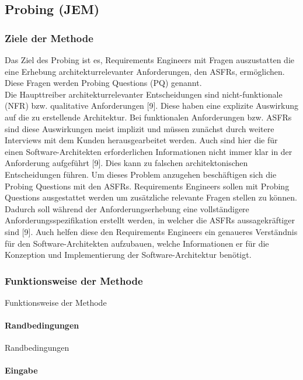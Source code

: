 \subsection{Probing (JEM)}

\subsubsection{Ziele der Methode}

Das Ziel des Probing ist es, Requirements Engineers mit Fragen auszustatten die eine Erhebung architekturrelevanter Anforderungen, den ASFRs, ermöglichen. Diese Fragen werden Probing Questions (PQ) genannt. \\

Die Haupttreiber architekturrelevanter Entscheidungen sind nicht-funktionale (NFR) bzw. qualitative Anforderungen [9]. Diese haben eine explizite Auswirkung auf die zu erstellende Architektur. Bei funktionalen Anforderungen bzw. ASFRs sind diese Auswirkungen meist implizit und müssen zunächst durch weitere Interviews mit dem Kunden herausgearbeitet werden. Auch sind hier die für einen Software-Architekten erforderlichen Informationen nicht immer klar in der Anforderung aufgeführt [9]. Dies kann zu falschen architektonischen Entscheidungen führen. Um dieses Problem anzugehen beschäftigen sich die Probing Questions mit den ASFRs. Requirements Engineers sollen mit Probing Questions ausgestattet werden um zusätzliche relevante Fragen stellen zu können. Dadurch soll während der Anforderungserhebung eine vollständigere Anforderungsspezifikation erstellt werden, in welcher die ASFRs aussagekräftiger sind [9]. Auch helfen diese den Requirements Engineers ein genaueres Verständnis für den Software-Architekten aufzubauen, welche Informationen er für die Konzeption und Implementierung der Software-Architektur benötigt. \\

\subsubsection{Funktionsweise der Methode}

Funktionsweise der Methode


\paragraph{Randbedingungen}

Randbedingungen


\paragraph{Eingabe}

